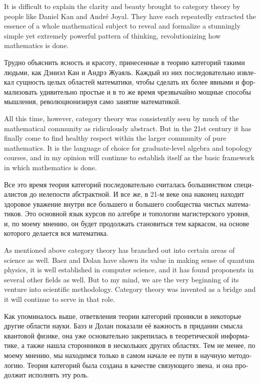 \documentclass[a4paper]{book}
\theoremstyle{myth}
\begin{document}
\begin{russian}
It is difficult to explain the clarity and beauty brought to category theory by people like Daniel Kan and Andr\'{e} Joyal. They have each repeatedly extracted the essence of a whole mathematical subject to reveal and formalize a stunningly simple yet extremely powerful pattern of thinking, revolutionizing how mathematics is done.

Трудно объяснить ясность и красоту, принесенные в теорию категорий такими людьми, как Дэниэл Кан и Андрэ Жуаяль. Каждый из них последовательно извлекал сущность целых областей математики, чтобы сделать их более явными и формализовать удивительно простые и в то же время чрезвычайно мощные способы мышления, революционизируя само занятие математикой. 

All this time, however, category theory was consistently seen by much of the mathematical community as ridiculously abstract. But in the 21st century it has finally come to find healthy respect within the larger community of pure mathematics. It is the language of choice for graduate-level algebra and topology courses, and in my opinion will continue to establish itself as the basic framework in which mathematics is done.

Все это время теория категорий последовательно считалась большинством специалистов до нелепости абстрактной. И все же, в 21-м веке она наконец находит здоровое уважение внутри все большего и большего сообщества чистых математиков. Это основной язык курсов по алгебре и топологии магистерского уровня, и, по моему мнению, он будет продолжать становиться тем каркасом, на основе которого делается вся математика. 

As mentioned above category theory has branched out into certain areas of science as well. Baez and Dolan have shown its value in making sense of quantum physics, it is well established in computer science, and it has found proponents in several other fields as well. But to my mind, we are the very beginning of its venture into scientific methodology. Category theory was invented as a bridge and it will continue to serve in that role.

Как упоминалось выше, ответвления теории категорий проникли в некоторые другие области науки. Баэз и Долан показали её важность в придании смысла квантовой физике, она уже основательно закрепилась в теоретической информатике, а также нашла сторонников в нескольких других областях. Тем не менее, по моему мнению, мы находимся только в самом начале ее пути в научную методологию. Теория категорий была создана в качестве связующего звена, и она продолжит исполнять эту роль. 


\end{russian}
\end{document}
